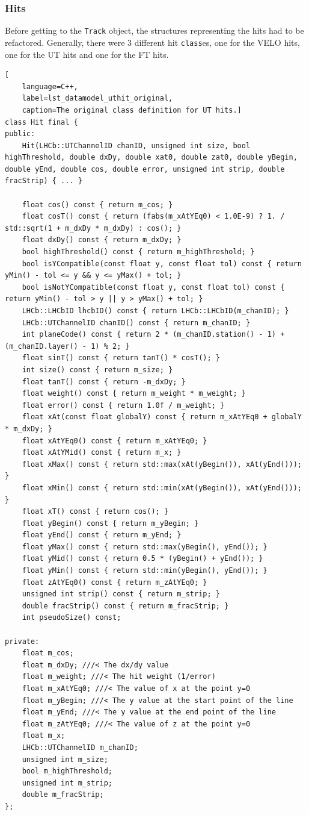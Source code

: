 \documentclass[12pt]{article}
\newcommand{\code}[1]{\texttt{#1}}
\begin{document}
\subsubsection{Hits}

Before getting to the \code{Track} object, the structures representing the hits had to be refactored. Generally, there were 3 different hit \code{class}es, one for the VELO hits, one for the UT hits and one for the FT hits.

\begin{lstlisting}[
	language=C++,
	label=lst_datamodel_uthit_original,
	caption=The original class definition for UT hits.]
class Hit final {
public:
	Hit(LHCb::UTChannelID chanID, unsigned int size, bool highThreshold, double dxDy, double xat0, double zat0, double yBegin, double yEnd, double cos, double error, unsigned int strip, double fracStrip) { ... }

	float cos() const { return m_cos; }
	float cosT() const { return (fabs(m_xAtYEq0) < 1.0E-9) ? 1. / std::sqrt(1 + m_dxDy * m_dxDy) : cos(); }
	float dxDy() const { return m_dxDy; }
	bool highThreshold() const { return m_highThreshold; }
	bool isYCompatible(const float y, const float tol) const { return yMin() - tol <= y && y <= yMax() + tol; }
	bool isNotYCompatible(const float y, const float tol) const { return yMin() - tol > y || y > yMax() + tol; }
	LHCb::LHCbID lhcbID() const { return LHCb::LHCbID(m_chanID); }
	LHCb::UTChannelID chanID() const { return m_chanID; }
	int planeCode() const { return 2 * (m_chanID.station() - 1) + (m_chanID.layer() - 1) % 2; }
	float sinT() const { return tanT() * cosT(); }
	int size() const { return m_size; }
	float tanT() const { return -m_dxDy; }
	float weight() const { return m_weight * m_weight; }
	float error() const { return 1.0f / m_weight; }
	float xAt(const float globalY) const { return m_xAtYEq0 + globalY * m_dxDy; }
	float xAtYEq0() const { return m_xAtYEq0; }
	float xAtYMid() const { return m_x; }
	float xMax() const { return std::max(xAt(yBegin()), xAt(yEnd())); }
	float xMin() const { return std::min(xAt(yBegin()), xAt(yEnd())); }
	float xT() const { return cos(); }
	float yBegin() const { return m_yBegin; }
	float yEnd() const { return m_yEnd; }
	float yMax() const { return std::max(yBegin(), yEnd()); }
	float yMid() const { return 0.5 * (yBegin() + yEnd()); }
	float yMin() const { return std::min(yBegin(), yEnd()); }
	float zAtYEq0() const { return m_zAtYEq0; }
	unsigned int strip() const { return m_strip; }
	double fracStrip() const { return m_fracStrip; }
	int pseudoSize() const;

private:
	float m_cos;
	float m_dxDy; ///< The dx/dy value
	float m_weight; ///< The hit weight (1/error)
	float m_xAtYEq0; ///< The value of x at the point y=0
	float m_yBegin; ///< The y value at the start point of the line
	float m_yEnd; ///< The y value at the end point of the line
	float m_zAtYEq0; ///< The value of z at the point y=0
	float m_x;
	LHCb::UTChannelID m_chanID;
	unsigned int m_size;
	bool m_highThreshold;
	unsigned int m_strip;
	double m_fracStrip;
};
\end{lstlisting}
\end{document}

